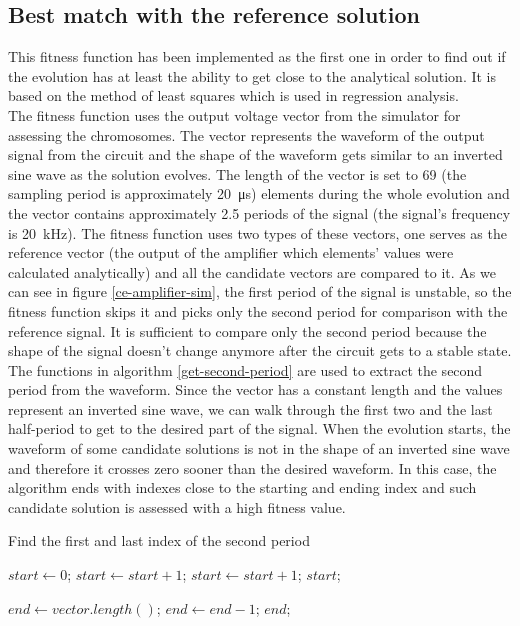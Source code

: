 \subsection{Best match with the reference solution}
This fitness function has been implemented as the first one in order to find out if the evolution has at least the ability to get close to the analytical solution. It is based on the method of least squares which is used in regression analysis.\\
    The fitness function uses the output voltage vector from the simulator for assessing the chromosomes. The vector represents the waveform of the output signal from the circuit and the shape of the waveform gets similar to an inverted sine wave as the solution evolves. The length of the vector is set to 69 (the sampling period is approximately \SI{20}{\micro\second}) elements during the whole evolution and the vector contains approximately 2.5 periods of the signal (the signal's frequency is \SI{20}{\kilo\hertz}). The fitness function uses two types of these vectors, one serves as the reference vector (the output of the amplifier which elements' values were calculated analytically) and all the candidate vectors are compared to it. As we can see in figure \ref{ce-amplifier-sim}, the first period of the signal is unstable, so the fitness function skips it and picks only the second period for comparison with the reference signal. It is sufficient to compare only the second period because the shape of the signal doesn't change anymore after the circuit gets to a stable state.\\
    The functions in algorithm \ref{get-second-period} are used to extract the second period from the waveform. Since the vector has a constant length and the values represent an inverted sine wave, we can walk through the first two and the last half-period to get to the desired part of the signal. When the evolution starts, the waveform of some candidate solutions is not in the shape of an inverted sine wave and therefore it crosses zero sooner than the desired waveform. In this case, the algorithm ends with indexes close to the starting and ending index and such candidate solution is assessed with a high fitness value.

    \begin{algorithm}
    \caption{Find the first and last index of the second period}
    \label{get-second-period}
    \begin{algorithmic}[1]
            \State $start \gets 0$;
                \State $start \gets start + 1$;
            \EndWhile
                \State $start \gets start + 1$;
            \EndWhile
            \State \Return $start$;
        \EndFunction

            \State $end \gets vector.length()$;
                \State $end \gets end - 1$;
            \EndWhile
            \State \Return $end$;
        \EndFunction
    \end{algorithmic}
    \end{algorithm}

